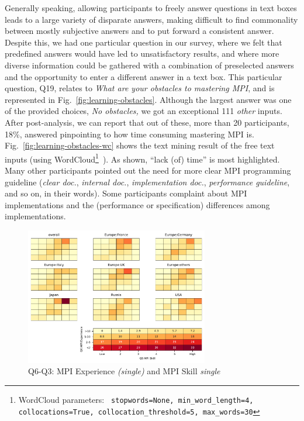 \documentclass[preprint,5p,times]{elsarticle}
\def\myquote#1{{\it #1}}
\newcommand{\revision}[2]{{\color{blue}#2}}
\begin{document}
Generally speaking, allowing participants to freely answer questions in text
boxes \revision{lead}{leads} to a large variety of disparate answers, making difficult to find
commonality between mostly subjective answers and to put forward a consistent
answer. Despite this, we had one particular question in our survey, where we
felt that predefined answers would have \revision{been}{} led to unsatisfactory results, and
where more diverse information could be gathered with a combination of
preselected answers and the opportunity to enter a different answer in a text
box. This particular question, Q19, relates to \myquote{What are your obstacles
to mastering MPI}, and is represented in Fig.~\ref{fig:learning-obstacles}.
Although the largest answer was one of the provided choices, \myquote{No
obstacles,} we got an exceptional 111 \myquote{other} inputs.
After post-analysis, we can report that out of these, 
more than 20 participants, 18\%, answered pinpointing
to how time consuming mastering MPI is.
\revision{}{Fig.~\ref{fig:learning-obstacles-wc} shows the text mining result of
the free text inputs
(using WordCloud\footnote{WordCloud parameters: \tt
  stopwords=None, min\_word\_length=4, collocations=True,
  collocation\_threshold=5, max\_words=30}~\cite{wordcloud}).
As shown, ``lack (of) time'' is most highlighted.}
Many other
participants pointed out the need for more clear MPI programming guideline
(\myquote{clear doc.}, \myquote{internal doc.}, \myquote{implementation doc.},
\myquote{performance guideline}, and so on, in their words). Some participants
\revision{complaints}{complaint} about MPI implementations and the (performance or specification)
differences among implementations.

\begin{figure}[tb]
\begin{center}
\includegraphics[width=8.0cm]{Figs/Q6-Q3.pdf}
\caption{Q6-Q3: MPI Experience {\it(single)} and MPI Skill {\it single}}
\label{fig:experience-and-skill}
\vspace{-3mm}%
\end{center}
\end{figure}
\end{document}
